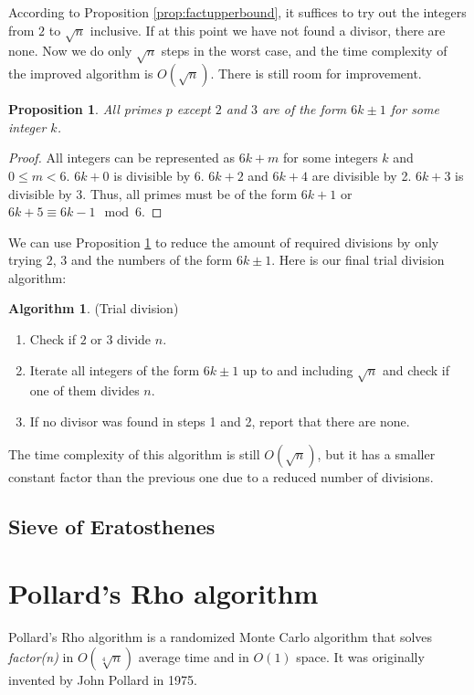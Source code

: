 \documentclass[12pt] {article}
\theoremstyle{plain}
\newtheorem{prop}[thm]{Proposition}
\theoremstyle{definition}
\newtheorem{algo}[thm]{Algorithm}
\begin{document}
According to Proposition \ref{prop:factupperbound}, it suffices to try out the integers from $2$ to $\sqrt{n}$ inclusive. If at this point we have not found a divisor, there are none. Now we do only $\sqrt{n}$ steps in the worst case, and the time complexity of the improved algorithm is $O(\sqrt{n})$. There is still room for improvement.

\begin{prop}
\label {prop:primes6pm1}
All primes $p$ except $2$ and $3$ are of the form $6k \pm 1$ for some integer $k$.
\end{prop}

\begin{proof}
All integers can be represented as $6k + m$ for some integers $k$ and $0 \leq m < 6$. $6k + 0$ is divisible by 6. $6k + 2$ and $6k + 4$ are divisible by 2. $6k + 3$ is divisible by 3. Thus, all primes must be of the form $6k + 1$ or $6k + 5 \equiv 6k - 1 \mod 6$.
\end{proof}

We can use Proposition \ref{prop:primes6pm1} to reduce the amount of required divisions by only trying $2$, $3$ and the numbers of the form $6k \pm 1$. Here is our final trial division algorithm:
\begin{algo} (Trial division)
\begin{enumerate}
\item Check if $2$ or $3$ divide $n$.
\item Iterate all integers of the form $6k \pm 1$ up to and including $\sqrt{n}$ and check if one of them divides $n$.
\item If no divisor was found in steps 1 and 2, report that there are none.
\end{enumerate}
\end{algo}

The time complexity of this algorithm is still $O(\sqrt{n})$, but it has a smaller constant factor than the previous one due to a reduced number of divisions.

\subsection {Sieve of Eratosthenes}

\section {Pollard's Rho algorithm}

Pollard's Rho algorithm is a randomized Monte Carlo algorithm that solves \textit{factor(n)} in $O(\sqrt[4]{n})$ average time and in $O(1)$ space. It was originally invented by John Pollard in 1975\cite{pollard}.
\end{document}
